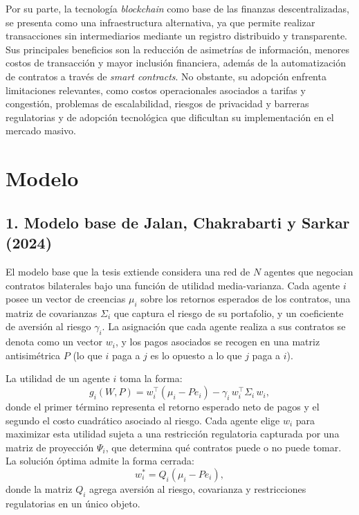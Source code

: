 \documentclass[12pt,a4paper]{article}
\begin{document}
Por su parte, la tecnología \textit{blockchain} como base de las finanzas descentralizadas, se
presenta como una infraestructura alternativa, ya que permite realizar transacciones sin
intermediarios mediante un registro distribuido y transparente. Sus principales beneficios son
la reducción de asimetrías de información, menores costos de transacción y mayor inclusión
financiera, además de la automatización de contratos a través de \textit{smart contracts}. No
obstante, su adopción enfrenta limitaciones relevantes, como costos operacionales asociados
a tarifas y congestión, problemas de escalabilidad, riesgos de privacidad y barreras
regulatorias y de adopción tecnológica que dificultan su implementación en el mercado masivo.


\section*{Modelo}

\subsection*{1. Modelo base de Jalan, Chakrabarti y Sarkar (2024)}

El modelo base que la tesis extiende considera una red de $N$ agentes que negocian contratos
bilaterales bajo una función de utilidad media-varianza. Cada agente $i$ posee un vector de
creencias $\mu_i$ sobre los retornos esperados de los contratos, una matriz de covarianzas
$\Sigma_i$ que captura el riesgo de su portafolio, y un coeficiente de aversión al riesgo
$\gamma_i$. La asignación que cada agente realiza a sus contratos se denota como un vector
$w_i$, y los pagos asociados se recogen en una matriz antisimétrica $P$ (lo que $i$ paga a $j$
es lo opuesto a lo que $j$ paga a $i$).

La utilidad de un agente $i$ toma la forma:
\begin{equation}
    g_i(W, P) = w_i^\top (\mu_i - P e_i) - \gamma_i\, w_i^\top \Sigma_i\, w_i,
\end{equation}
donde el primer término representa el retorno esperado neto de pagos y el segundo el costo
cuadrático asociado al riesgo. Cada agente elige $w_i$ para maximizar esta utilidad sujeta a
una restricción regulatoria capturada por una matriz de proyección $\Psi_i$, que determina qué
contratos puede o no puede tomar. La solución óptima admite la forma cerrada:
\begin{equation}
    w_i^* = Q_i (\mu_i - P e_i),
\end{equation}
donde la matriz $Q_i$ agrega aversión al riesgo, covarianza y restricciones regulatorias en un
único objeto.
\end{document}
